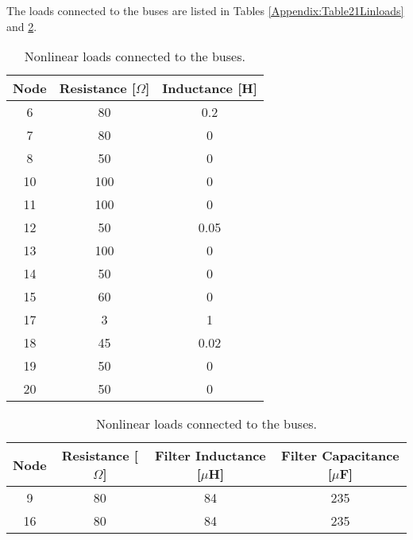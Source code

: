 \documentclass[a4paper]{article}
\theoremstyle{plain}
\begin{document}
		The loads connected to the buses are listed in Tables \ref{Appendix:Table21Linloads} and \ref{Appendix:Table21loads}.
		\begin{table}[!h]
			\centering
			\begin{tabular}{ccc}
				\toprule
				Node & Resistance [$\Omega$] & Inductance [H] \\
				\midrule
				6 & 80 & 0.2 \\
				7 & 80 & 0 \\
				8 & 50 & 0 \\
				10 & 100 & 0 \\
				11 & 100 & 0 \\
				12 & 50 & 0.05 \\
				13 & 100 & 0 \\
				14 & 50 & 0 \\
				15 & 60 & 0 \\
				17 & 3 & 1 \\
				18 & 45 & 0.02 \\
				19 & 50 & 0 \\
				20 & 50 & 0\\
				\bottomrule
			\end{tabular}
			\caption{Linear loads parameters.}
			\label{Appendix:Table21Linloads}
			\vspace{1cm}
			
			\begin{tabular}{cccc}
				\toprule
				Node & Resistance [$\Omega$] & Filter Inductance [$\mu$H] & Filter Capacitance [$\mu$F]\\
				\midrule
				9 & 80 & 84 & 235\\
				16 & 80 & 84 & 235\\
				\bottomrule
			\end{tabular}
			\caption{Nonlinear loads connected to the buses.}
			\label{Appendix:Table21loads}
		\end{table}
		
\end{document}
